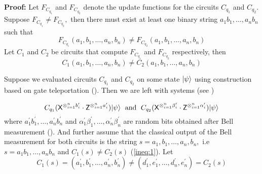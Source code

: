 \begin{flushleft}
{\bf Proof:} Let $F_{C_{q_1}}$ and $F_{C_{q_2}}$ denote the update functions for the circuits $C_{q_1}$ and $C_{q_2}.$ Suppose $F_{C_{q_1}}\neq F_{C_{q_2}},$  then there must exist at least one binary string $a_1b_1,\ldots, a_nb_n$ such that
\begin{equation}
\label{fun:assumption1}
F_{C_{q_1}}(a_1,b_1,\ldots,a_n,b_n)\neq F_{C_{q_2}}(a_1,b_1,\ldots,a_n,b_n)
\end{equation}
Let $C_1$ and $C_2$ be circuits that compute $F_{C_{q_1}}$ and $F_{C_{q_2}}$ respectively, then
\begin{equation}
\label{ineq:1}
C_1(a_1,b_1,\ldots,a_n,b_n)\neq C_2(a_1,b_1,\ldots,a_n,b_n)
\end{equation}



Suppose we evaluated circuits $C_{q_1}$ and $C_{q_2}$ on some state ${\lvert}\psi\rangle$ using construction based on gate teleportation (). Then we are left with systems  (see )%

 \begin{equation}
  \label{eq:2}
C_{q_1} ({\sf X}^{\otimes_{i=1}^{n} b_{i}^\prime} \cdot {\sf Z}^{\otimes_{i=1}^{n}a_{i}^\prime}){\lvert}\psi\rangle \;\mbox{ and }\;
C_{q_2} ({\sf X}^{\otimes_{i=1}^{n} \beta_{i}^\prime} \cdot {\sf Z}^{\otimes_{i=1}^{n}\alpha_{i}^\prime}){\lvert}\psi\rangle
\end{equation}
where $a_1^\prime b_1^\prime,\ldots, a_n^\prime b_n^\prime$ and $\alpha_1^\prime \beta_1^\prime,\ldots, \alpha_n^\prime \beta_n^\prime$ are random bits obtained after Bell measurement ().   And further assume that the classical output of the Bell measurement for both circuits is the string  $s=a_1,b_1,\ldots,a_n,b_n,$ i.e  $s=a_1b_1,\ldots, a_nb_n$ and  $C_1(s)\neq C_2(s)$ (\ref{ineq:1}). Let
 \begin{equation}
 \label{eq:3}
C_1(s)=(a^\prime_1,b^\prime_1,\ldots, a^\prime_n,b^\prime_n)\neq(d_1^\prime,e_1^\prime,\ldots, d_n^\prime,e^\prime_n)=C_2(s)
\end{equation}




\end{flushleft}
